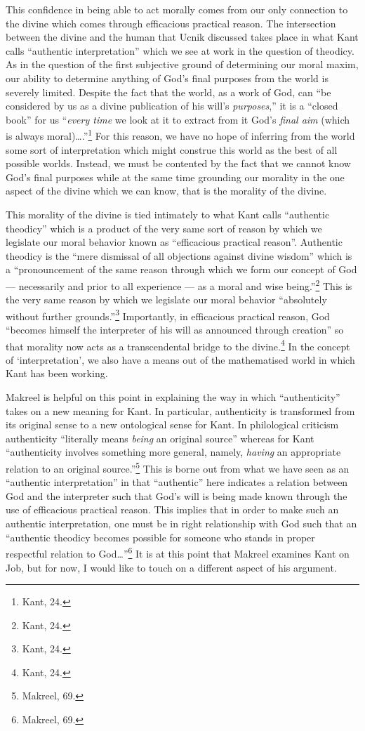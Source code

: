 \documentclass[12pt]{article}
\begin{document}
	This confidence in being able to act morally comes from our only connection to the divine which comes through efficacious practical reason. The intersection between the divine and the human that Ucnik discussed takes place in what Kant calls ``authentic interpretation'' which we see at work in the question of theodicy. As in the question of the first subjective ground of determining our moral maxim, our ability to determine anything of God's final purposes from the world is severely limited. Despite the fact that the world, as a work of God, can ``be considered by us as a divine publication of his will's \emph{purposes},'' it is a ``closed book'' for us ``\emph{every time} we look at it to extract from it God's \emph{final aim} (which is always moral)\ldots.''\footnote{Kant, 24.} For this reason, we have no hope of inferring from the world some sort of interpretation which might construe this world as the best of all possible worlds. Instead, we must be contented by the fact that we cannot know God's final purposes while at the same time grounding our morality in the one aspect of the divine which we can know, that is the morality of the divine. 
	
	This morality of the divine is tied intimately to what Kant calls ``authentic theodicy'' which is a product of the very same sort of reason by which we legislate our moral behavior known as ``efficacious practical reason''. Authentic theodicy is the ``mere dismissal of all objections against divine wisdom'' which is a ``pronouncement of the same reason through which we form our concept of God --- necessarily and prior to all experience --- as a moral and wise being.''\footnote{Kant, 24.} This is the very same reason by which we legislate our moral behavior ``absolutely without further grounds.''\footnote{Kant, 24.} Importantly, in efficacious practical reason, God ``becomes himself the interpreter of his will as announced through creation'' so that morality now acts as a transcendental bridge to the divine.\footnote{Kant, 24.} In the concept of `interpretation', we also have a means out of the mathematised world in which Kant has been working. 
	
	Makreel is helpful on this point in explaining the way in which ``authenticity'' takes on a new meaning for Kant. In particular, authenticity is transformed from its original sense to a new ontological sense for Kant. In philological criticism authenticity ``literally means \emph{being} an original source'' whereas for Kant ``authenticity involves something more general, namely, \emph{having} an appropriate relation to an original source.''\footnote{Makreel, 69.} This is borne out from what we have seen as an ``authentic interpretation'' in that ``authentic'' here indicates a relation between God and the interpreter such that God's will is being made known through the use of efficacious practical reason. This implies that in order to make such an authentic interpretation, one must be in right relationship with God such that an ``authentic theodicy becomes possible for someone who stands in proper respectful relation to God\ldots''\footnote{Makreel, 69.} It is at this point that Makreel examines Kant on Job, but for now, I would like to touch on a different aspect of his argument.
	
\end{document}
